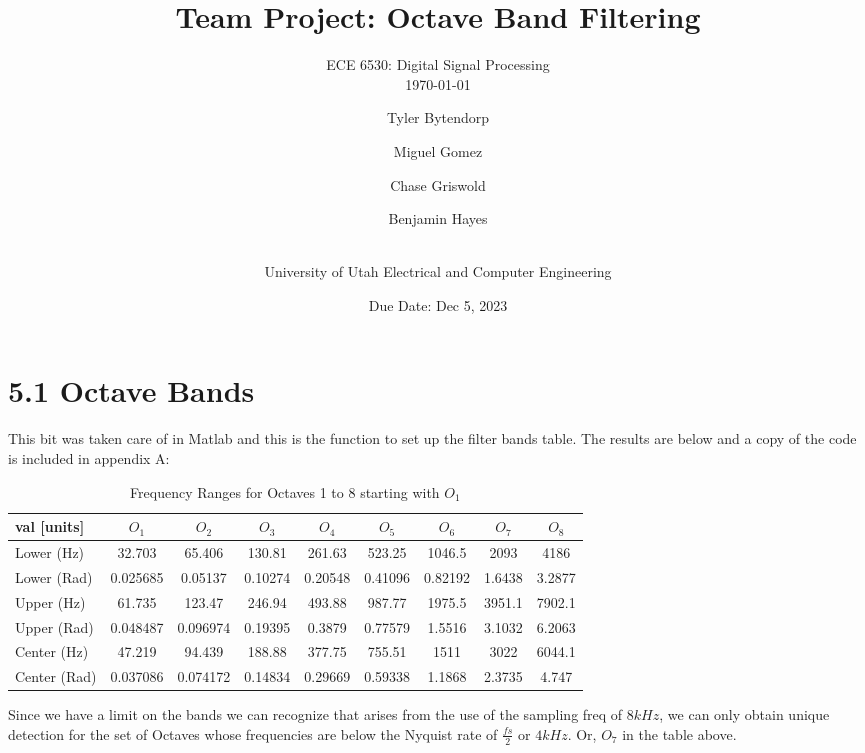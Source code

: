 \documentclass[a4paper, 11pt]{exam}
\title{Team Project: Octave Band Filtering}
\subtitle{ECE 6530: Digital Signal Processing \\
\today\\}
\author{ Tyler Bytendorp \and Miguel Gomez \and Chase Griswold \and Benjamin Hayes \and\\
University of Utah Electrical and Computer Engineering}
\date{Due Date: Dec 5, 2023}
\begin{document}
\maketitle
\noindent

\section*{5.1 Octave Bands}
This bit was taken care of in Matlab and this is the function to set up the filter bands table. The results are below and a copy of the code is included in appendix A:
\begin{table}[!ht]
\centering
\begin{tabular}{|l|c|c|c|c|c|c|c|c|}
\hline
val [units] & $O_1$  & $O_2$ & $O_3$ & $O_4$ & $O_5$ & $O_6$ & $O_7$ & $O_8$ \\
\hline
Lower (Hz)   & 32.703 & 65.406   & 130.81   & 261.63   & 523.25   & 1046.5   & 2093     & 4186    \\
\hline
Lower (Rad)  & 0.025685 & 0.05137  & 0.10274  & 0.20548  & 0.41096  & 0.82192  & 1.6438   & 3.2877  \\
\hline
Upper (Hz)   & 61.735 & 123.47   & 246.94   & 493.88   & 987.77   & 1975.5   & 3951.1   & 7902.1  \\
\hline
Upper (Rad) & 0.048487 & 0.096974 & 0.19395  & 0.3879   & 0.77579  & 1.5516   & 3.1032   & 6.2063  \\
\hline
Center (Hz)  & 47.219 & 94.439   & 188.88   & 377.75   & 755.51   & 1511     & 3022     & 6044.1  \\
\hline
Center (Rad) & 0.037086 & 0.074172 & 0.14834  & 0.29669  & 0.59338  & 1.1868   & 2.3735   & 4.747   \\
\hline
\end{tabular}
\caption{Frequency Ranges for Octaves 1 to 8 starting with $O_1$}
\end{table}
Since we have a limit on the bands we can recognize that arises from the use of the sampling freq of $8kHz$, we can only obtain unique detection for the set of Octaves whose frequencies are below the Nyquist rate of $\frac{fs}{2}$ or $4kHz$. Or, $O_7$ in the table above.
\end{document}
